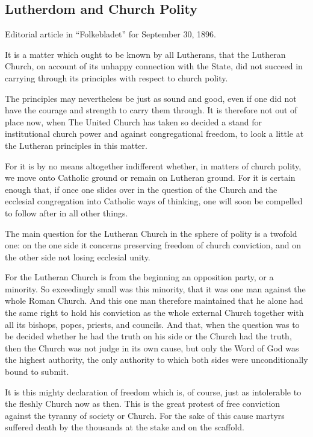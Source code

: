 
\subsection{Lutherdom and Church Polity}

Editorial article in “Folkebladet” for September 30, 1896.

It is a matter which ought to be known by all Lutherans, that the Lutheran Church, on account of its unhappy connection with the State, did not succeed in carrying through its principles with respect to church polity.

The principles may nevertheless be just as sound and good, even if one did not have the courage and strength to carry them through. It is therefore not out of place now, when The United Church has taken so decided a stand for institutional church power and against congregational freedom, to look a little at the Lutheran principles in this matter.

For it is by no means altogether indifferent whether, in matters of church polity, we move onto Catholic ground or remain on Lutheran ground. For it is certain enough that, if once one slides over in the question of the Church and the ecclesial congregation into Catholic ways of thinking, one will soon be compelled to follow after in all other things.

The main question for the Lutheran Church in the sphere of polity is a twofold one: on the one side it concerns preserving freedom of church conviction, and on the other side not losing ecclesial unity.

For the Lutheran Church is from the beginning an opposition party, or a minority. So exceedingly small was this minority, that it was one man against the whole Roman Church. And this one man therefore maintained that he alone had the same right to hold his conviction as the whole external Church together with all its bishops, popes, priests, and councils. And that, when the question was to be decided whether he had the truth on his side or the Church had the truth, then the Church was not judge in its own cause, but only the Word of God was the highest authority, the only authority to which both sides were unconditionally bound to submit.

It is this mighty declaration of freedom which is, of course, just as intolerable to the fleshly Church now as then. This is the great protest of free conviction against the tyranny of society or Church. For the sake of this cause martyrs suffered death by the thousands at the stake and on the scaffold.

